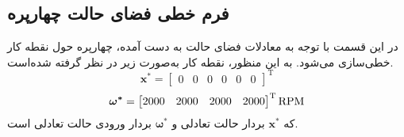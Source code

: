 \subsection{فرم خطی فضای حالت چهارپره}\label{lin_MIMO}
در این قسمت با توجه به معادلات فضای حالت به دست آمده، چهارپره حول نقطه کار خطی‌سازی می‌شود. به این منظور، نقطه کار به‌صورت زیر در نظر گرفته شده‌است.
\begin{equation}
	\boldsymbol{x^*} = \begin{bmatrix} %
		0& 0 & 0 & 0& 0& 0
	\end{bmatrix}^\mathrm{T}
\end{equation}
\begin{equation}
	\boldsymbol{\omega^*} = \begin{bmatrix}
		2000&2000&2000&2000
	\end{bmatrix}^\mathrm{T}\rm{RPM}
\end{equation}
که $\boldsymbol{x^*}$ بردار حالت تعادلی و $\boldsymbol{\omega^*}$ بردار ورودی حالت تعادلی است.
